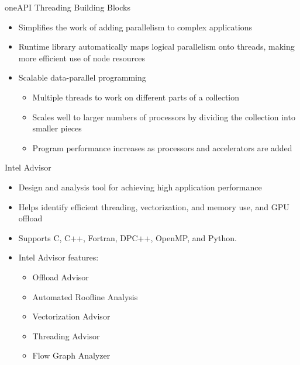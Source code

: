\documentclass[aspectratio=169]{beamer}
\begin{document}
\begin{frame}{oneAPI Threading Building Blocks}
\begin{itemize}
  \item Simplifies the work of adding parallelism to complex applications
  \item Runtime library automatically maps logical parallelism onto threads, making more efficient use of node resources
  \item Scalable data-parallel programming
    \begin{itemize}
    \item Multiple threads to work on different parts of a collection
    \item Scales well to larger numbers of processors by dividing the collection into smaller pieces
    \item Program performance increases as processors and accelerators are added
  \end{itemize}
\end{itemize}
\end{frame}

\begin{frame}{Intel Advisor}
\begin{itemize}
  \item Design and analysis tool for achieving high application performance
  \item Helps identify efficient threading, vectorization, and memory use, and GPU offload
  \item Supports C, C++, Fortran, DPC++, OpenMP, and Python.
  \item Intel Advisor features:
  \begin{itemize}
    \item Offload Advisor
    \item Automated Roofline Analysis
    \item Vectorization Advisor
    \item Threading Advisor
    \item Flow Graph Analyzer
  \end{itemize}
\end{itemize}
\end{frame}
\end{document}
